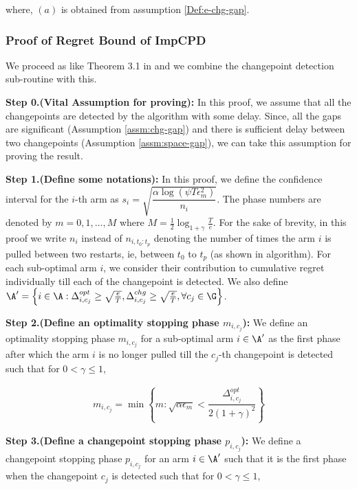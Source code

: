 \begin{customproof}{2}
where, $(a)$ is obtained from assumption \ref{Def:e-chg-gap}.
\end{customproof}

\subsubsection{Proof of Regret Bound of ImpCPD}
\label{sec:proof:Theorem:2}


\begin{customproof}{3}
\label{proof:Theorem:2}

We proceed as like Theorem 3.1 in \citet{auer2010ucb} and we combine the changepoint detection sub-routine with this. 

\textbf{Step 0.(Vital Assumption for proving):} In this proof, we assume that all the changepoints are detected by the algorithm with some delay. Since, all the gaps are significant (Assumption \ref{assm:chg-gap}) and there is sufficient delay between two changepoints (Assumption \ref{assm:space-gap}), we can take this assumption for proving the result.

\textbf{Step 1.(Define some notations):} In this proof, we define the confidence interval for the $i$-th arm as $s_i=\sqrt{\dfrac{\alpha\log(\psi T\epsilon_m^2)}{n_{i}}}$. The phase numbers are denoted by $m=0,1,\ldots,M$ where $M=\frac{1}{2}\log_{1+\gamma}\frac{T}{e}$. For the sake of brevity, in this proof we write $n_i$ instead of $n_{i,t_0:t_p}$ denoting the number of times the arm $i$ is pulled between two restarts, ie, between $t_0$ to $t_p$ (as shown in algorithm). For each sub-optimal arm $i$, we consider their contribution to cumulative regret individually till each of the changepoint is detected. We also define $\A'=\left\lbrace i\in\A: \Delta^{opt}_{i,c_j}\geq \sqrt{\frac{e}{T}}, \Delta^{chg}_{i,c_j}\geq \sqrt{\frac{e}{T}},\forall c_j\in\G \right\rbrace$.

\textbf{Step 2.(Define an optimality stopping phase $m_{i,c_j}$):} We define an optimality stopping phase $m_{i,c_j}$ for a sub-optimal arm $i\in\A'$ as the first phase after which the arm $i$ is no longer pulled till the $c_j$-th changepoint is detected such that for $0<\gamma\leq 1$,

\begin{align*}
m_{i,c_j} = \min\left\lbrace m: \sqrt{\alpha\epsilon_{m}} < \dfrac{\Delta^{opt}_{i,c_j}}{2(1+\gamma)^2} \right\rbrace
\end{align*} 

\textbf{Step 3.(Define a changepoint stopping phase $p_{i,c_j}$):} We define a changepoint stopping phase $p_{i,c_j}$ for an arm $i\in\A'$ such that it is the first phase when the changepoint $c_j$ is detected such that for $0<\gamma\leq 1$,


\end{customproof}
